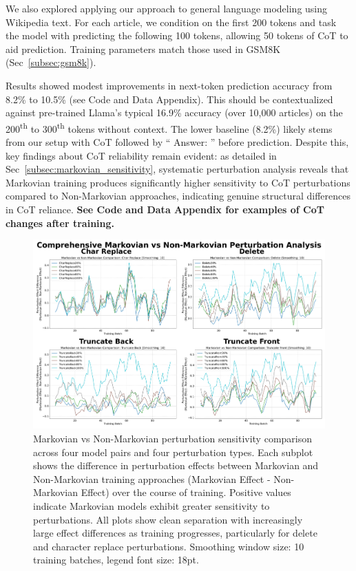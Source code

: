 \documentclass[letterpaper]{article} %
\begin{document}
We also explored applying our approach to general language modeling using Wikipedia text. For each article, we condition on the first 200 tokens and task the model with predicting the following 100 tokens, allowing 50 tokens of CoT to aid prediction. Training parameters match those used in GSM8K (Sec~\ref{subsec:gsm8k}).

Results showed modest improvements in next-token prediction accuracy from 8.2\% to 10.5\% (see Code and Data Appendix). This should be contextualized against pre-trained Llama's typical 16.9\% accuracy (over 10,000 articles) on the 200\textsuperscript{th} to 300\textsuperscript{th} tokens without context. The lower baseline (8.2\%) likely stems from our setup with CoT followed by `` Answer: '' before prediction. Despite this, key findings about CoT reliability remain evident: as detailed in Sec~\ref{subsec:markovian_sensitivity}, systematic perturbation analysis reveals that Markovian training produces significantly higher sensitivity to CoT perturbations compared to Non-Markovian approaches, indicating genuine structural differences in CoT reliance.
\textbf{See Code and Data Appendix for examples of CoT changes after training.}

\begin{figure}[ht]
  \centering
  \includegraphics[width=\textwidth]{Figures/combined_markovian_comparison_plots.png}
  \caption{Markovian vs Non-Markovian perturbation sensitivity comparison across four model pairs and four perturbation types. Each subplot shows the difference in perturbation effects between Markovian and Non-Markovian training approaches (Markovian Effect - Non-Markovian Effect) over the course of training. Positive values indicate Markovian models exhibit greater sensitivity to perturbations. All plots show clean separation with increasingly large effect differences as training progresses, particularly for delete and character replace perturbations. Smoothing window size: 10 training batches, legend font size: 18pt.}
  \label{fig:markovian_comparison}
\end{figure}
\end{document}
